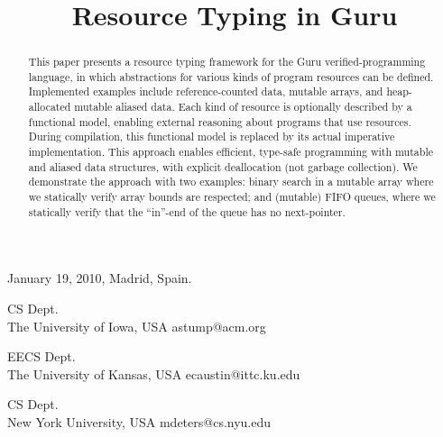 \documentclass[9pt,natbib]{sigplanconf}
\begin{document}
 {January 19, 2010, Madrid, Spain.}
\copyrightdata{\ } 

\titlebanner{\ }        %
\preprintfooter{\ }   %



\title{Resource Typing in Guru}

{CS Dept.\\ The University of Iowa, USA}
{astump@acm.org}

{EECS Dept.\\ The University of Kansas, USA}
{ecaustin@ittc.ku.edu}

{CS Dept.\\ New York University, USA}
{mdeters@cs.nyu.edu}

\maketitle


\begin{abstract}
This paper presents a resource typing framework for the Guru
verified-programming language, in which abstractions for various kinds
of program resources can be defined.  Implemented examples include
reference-counted data, mutable arrays, and heap-allocated mutable
aliased data.  Each kind of resource is optionally described by a
functional model, enabling external reasoning about programs that use
resources.  During compilation, this functional model is replaced by
its actual imperative implementation.  This approach enables
efficient, type-safe programming with mutable and aliased data
structures, with explicit deallocation (not garbage collection).  We
demonstrate the approach with two examples: binary search in a mutable
array where we statically verify array bounds are respected; and
(mutable) FIFO queues, where we statically verify that the ``in''-end
of the queue has no next-pointer.
\end{abstract}

\end{document}
